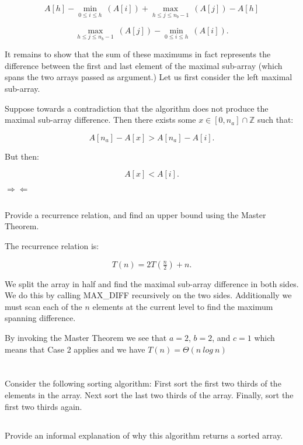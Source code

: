 \documentclass{amsart}
\theoremstyle{definition}
\theoremstyle{remark}
\numberwithin{equation}{section}
\newcommand{\ZZ}{\mathbb Z}
\begin{document}
$$ A[h] - \min_{0 \leq i \leq h}\ ( A[i] ) + \max_{h \leq j \leq n_b -1}\ ( A[j] ) - A[h] $$

$$ \max_{h \leq j \leq n_b -1}\ ( A[j] ) - \min_{0 \leq i \leq h}\ ( A[i] ). $$

\proof 

It remains to show that the sum of these maximums in fact represents the
difference between the first and last element of the maximal sub-array
(which spans the two arrays passed as argument.) Let us first consider the
left maximal sub-array.

Suppose towards a contradiction that the algorithm does not produce the
maximal sub-array difference. Then there exists some $x \in [0,n_a] \cap
\ZZ$ such that:

$$ A[n_a] - A[x] > A[n_a] - A[i]. $$

But then:

$$ A[x] < A[i]. $$

$\Rightarrow\Leftarrow$

\subsection{} Provide a recurrence relation, and find an upper bound
using the Master Theorem.

The recurrence relation is:

$$ T( n ) = 2T(\tfrac{n}{2}) + n. $$

We split the array in half and find the maximal sub-array
difference in both sides. We do this by calling MAX\_DIFF recursively on
the two sides. Additionally we must scan each of the $n$ elements at the current
level to find the maximum spanning difference.

By invoking the Master Theorem we see that $a=2$, $b=2$, and $c=1$ which
means that Case 2 applies and we have $T( n ) = \Theta( n\ log\ n )$


\section{} 

Consider the following sorting algorithm: First sort the
first two thirds of the elements in the array. Next sort the last two
thirds of the array. Finally, sort the first two thirds again.

\subsection{} Provide an informal explanation of why this algorithm
returns a sorted array. \\
\end{document}
